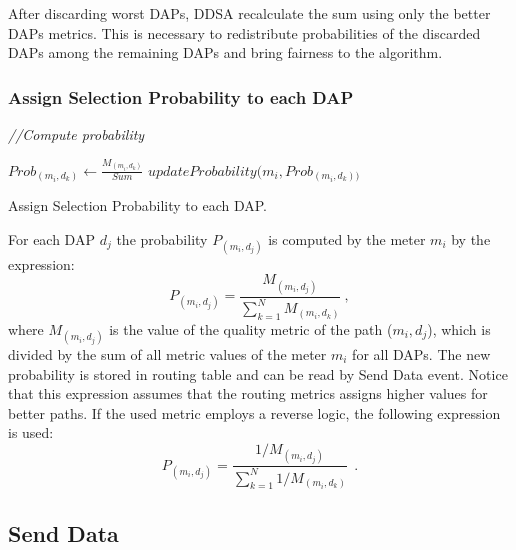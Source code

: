 \documentclass[conference]{IEEEtran}
\begin{document}
After discarding worst DAPs, DDSA recalculate the sum using only the better DAPs metrics. This is necessary to redistribute probabilities of the discarded DAPs among the remaining DAPs and bring fairness to the algorithm. 


\subsubsection{Assign Selection Probability to each DAP}\label{sec:probdap}

\IncMargin{1em}
\begin{algorithm}



\emph{//Compute probability}

 {
$Prob_{(m_{i},d_{k})} \leftarrow \frac {M_{(m_{i},d_{k})}}{Sum}$
\BlankLine
$updateProbability(m_{i},Prob_{(m_{i},d_{k}))}$
}

\BlankLine
\caption{Assign Selection Probability to each DAP.}
\label{atribprob}
\end{algorithm}\DecMargin{1em}


For each DAP $d_{j}$ the probability $ P_{(m_{i},d_{j})}$ is computed by
the meter $m_{i}$ by the expression: \begin{equation}  P_{(m_{i},d_{j})} =  \frac {M_{(m_{i},d_{j})}}{\sum\limits_{k=1}^{N} M_{(m_{i},d_{k})}} \ , \end{equation} where $M_{(m_{i},d_{j})}$ is the value of the quality metric of the path
($m_{i},d_{j}$), which is divided by the sum of all metric values of the meter $m_{i}$ for all DAPs. The new probability is stored in routing table and can be read by Send Data event.
Notice that this expression assumes that the routing metrics assigns higher values for better paths. If the used metric employs a reverse logic, the following expression is used: \begin{equation} P_{(m_{i},d_{j})} =  \frac {1/M_{(m_{i},d_{j})}}{\sum\limits_{k=1}^{N} 1/M_{(m_{i},d_{k})}} \  \ . \end{equation}



\subsection{Send Data}\label{sec:enviadados}
\end{document}
